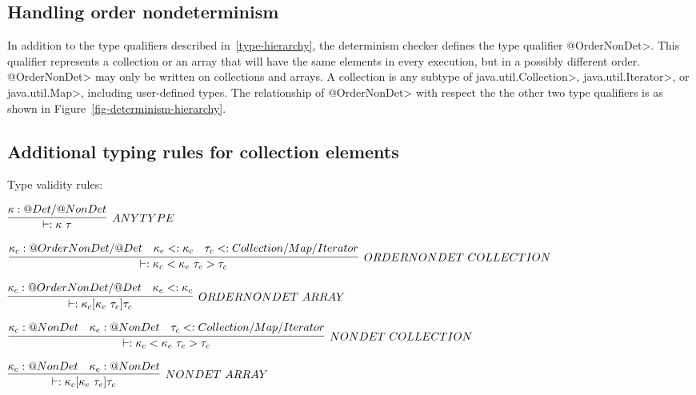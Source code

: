 \subsection{Handling order nondeterminism}
In addition to the type qualifiers described in~\ref{type-hierarchy}, the determinism checker 
defines the type qualifier \<@OrderNonDet>. This qualifier represents
a collection or an array that will have the same elements in every execution, but in a
possibly different order.  \<@OrderNonDet> may only be written on
collections and arrays.
A collection is any subtype of \<java.util.Collection>,
\<java.util.Iterator>, or \<java.util.Map>, including user-defined types. The relationship
of \<@OrderNonDet> with respect the the other two type qualifiers is  as shown in Figure~\ref{fig-determinism-hierarchy}.

\subsection{Additional typing rules for collection elements}\label{collection-rules}

%
%
%
Type validity rules:

$\infer[ANY TYPE]{\vdash : \kappa \  \tau}{\kappa : @Det / @NonDet}$


$\infer[ORDERNONDET \ COLLECTION]{\vdash : \kappa_c <\kappa_e \ \tau_e> \tau_c}{\kappa_c : @OrderNonDet/@Det & \kappa_e <: \kappa_c & \tau_c <: Collection/Map/Iterator}$

$\infer[ORDERNONDET \ ARRAY]{\vdash : \kappa_c [\kappa_e \ \tau_e] \tau_c}{\kappa_c : @OrderNonDet/@Det & \kappa_e <: \kappa_c }$

$\infer[NONDET \ COLLECTION]{\vdash : \kappa_c <\kappa_e \ \tau_e> \tau_c}{\kappa_c : @NonDet & \kappa_e : @NonDet & \tau_c <: Collection/Map/Iterator}$

$\infer[NONDET \ ARRAY]{\vdash : \kappa_c [\kappa_e \ \tau_e] \tau_c}{\kappa_c : @NonDet & \kappa_e : @NonDet }$

